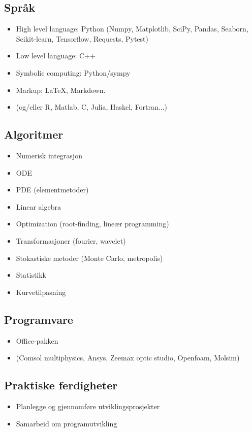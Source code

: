 \subsection{Språk}
\begin{itemize}
	\item High level language: Python (Numpy, Matplotlib, SciPy, Pandas, Seaborn, Scikit-learn, Tensorflow, Requests, Pytest)
	\item Low level language: C++
	\item Symbolic computing: Python/sympy
	\item Markup: LaTeX, Markdown.
	\item (og/eller R, Matlab, C, Julia, Haskel, Fortran...)
\end{itemize}

\subsection{Algoritmer}
\begin{itemize}
	\item Numerisk integrasjon
	\item ODE
	\item PDE (elementmetoder)
	\item Linear algebra
	\item Optimization (root-finding, lineær programming)
	\item Transformasjoner (fourier, wavelet)
	\item Stokastiske metoder (Monte Carlo, metropolis)
	\item Statistikk
	\item Kurvetilpasning
\end{itemize}


\subsection{Programvare}
\begin{itemize}
	\item Office-pakken
	\item (Comsol multiphysics, Ansys, Zeemax optic studio, Openfoam, Molsim)
\end{itemize}


\subsection{Praktiske ferdigheter}
\begin{itemize}
	\item Planlegge og gjennomføre utviklingsprosjekter
	\item Samarbeid om programutvikling
\end{itemize}

